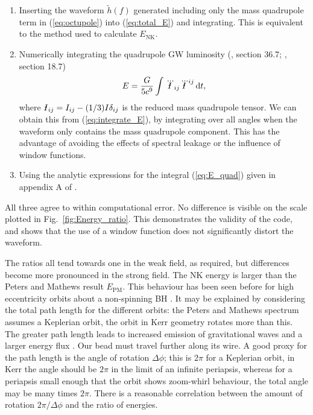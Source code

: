 \documentclass[useAMS,usedcolumn,usegraphicx,usenatbib]{mn2e}
\newcommand{\eqnref}[1]{(\ref{eq:#1})}
\newcommand{\figref}[1]{Fig.~\ref{fig:#1}}
\newcommand{\sub}[1]{\ensuremath{_\mathrm{#1}}}
\newcommand{\dd}{\ensuremath{\mathrm{d}}}
\newcommand{\intd}[4]{\ensuremath{\int_{#1}^{#2}{#3}\,\dd{#4}}}
\newcommand{\Ibar}{{\declareslashed{}{\text{-}}{0.04}{-0.2}{I}\slashed{I}}}
\begin{document}
\begin{enumerate}
\item Inserting the waveform $\widetilde{h}(f)$ generated including only the mass quadrupole term in \eqnref{octupole} into \eqnref{total_E} and integrating. This is equivalent to the method used to calculate $E\sub{NK}$.
\item Numerically integrating the quadrupole GW luminosity (\citealt{Misner1973}, section 36.7; \citealt{Hobson2006}, section 18.7)
\begin{equation}
E = \frac{G}{5c^9}\intd{}{}{\dddot{\Ibar}_{ij}\dddot{\Ibar}^{ij}}{t},
\label{eq:E_quad}
\end{equation}
where $\Ibar_{ij} = I_{ij} - (1/3)I\delta_{ij}$ is the reduced mass quadrupole tensor. We can obtain this from \eqnref{integrate_E}, by integrating over all angles when the waveform only contains the mass quadrupole component. This has the advantage of avoiding the effects of spectral leakage or the influence of window functions.
\item Using the analytic expressions for the integral \eqnref{E_quad} given in appendix A of \citet{Gair2005}.
\end{enumerate}
All three agree to within computational error. No difference is visible on the scale plotted in \figref{Energy_ratio}. This demonstrates the validity of the code, and shows that the use of a window function does not significantly distort the waveform.

The ratios all tend towards one in the weak field, as required, but differences become more pronounced in the strong field. The NK energy is larger than the Peters and Mathews result $E\sub{PM}$. This behaviour has been seen before for high eccentricity orbits about a non-spinning BH \citep{Gair2005}. It may be explained by considering the total path length for the different orbits: the Peters and Mathews spectrum assumes a Keplerian orbit, the orbit in Kerr geometry rotates more than this. The greater path length leads to increased emission of gravitational waves and a larger energy flux \citep{Berry2010}. Our bead must travel further along its wire. A good proxy for the path length is the angle of rotation $\Delta\phi$; this is $2\pi$ for a Keplerian orbit, in Kerr the angle should be $2\pi$ in the limit of an infinite periapsis, whereas for a periapsis small enough that the orbit shows zoom-whirl behaviour, the total angle may be many times $2\pi$. There is a reasonable correlation between the amount of rotation $2\pi/\Delta\phi$ and the ratio of energies.
\end{document}
